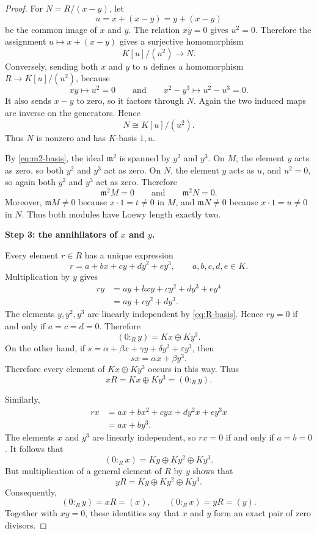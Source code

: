 \documentclass[a4paper]{amsart}
\theoremstyle{definition}
\theoremstyle{remark}
\numberwithin{equation}{section}
\begin{document}
\begin{proof}
For $N=R/(x-y)$, let
\[
 u=x+(x-y)=y+(x-y)
\]
be the common image of $x$ and $y$.  The relation $xy=0$ gives
$u^2=0$.  Therefore the assignment $u\mapsto x+(x-y)$ gives a
surjective homomorphism
\[
 K[u]/(u^2)\longrightarrow N.
\]
Conversely, sending both $x$ and $y$ to $u$ defines a homomorphism
$R\to K[u]/(u^2)$, because
\[
 xy\longmapsto u^2=0
 \qquad\text{and}\qquad
 x^2-y^3\longmapsto u^2-u^3=0.
\]
It also sends $x-y$ to zero, so it factors through $N$.  Again the two
induced maps are inverse on the generators.  Hence
\begin{equation}\label{eq:N-dual-numbers}
 N\cong K[u]/(u^2).
\end{equation}
Thus $N$ is nonzero and has $K$-basis $1,u$.

By \eqref{eq:m2-basis}, the ideal $\mathfrak m^2$ is spanned by $y^2$
and $y^3$.  On $M$, the element $y$ acts as zero, so both $y^2$ and
$y^3$ act as zero.  On $N$, the element $y$ acts as $u$, and
$u^2=0$, so again both $y^2$ and $y^3$ act as zero.  Therefore
\begin{equation}\label{eq:m2-kills-modules}
 \mathfrak m^2M=0
 \qquad\text{and}\qquad
 \mathfrak m^2N=0.
\end{equation}
Moreover, $\mathfrak mM\neq0$ because $x\cdot1=t\neq0$ in $M$, and
$\mathfrak mN\neq0$ because $x\cdot1=u\neq0$ in $N$.  Thus both
modules have Loewy length exactly two.

\medskip
\noindent
\textbf{Step 3: the annihilators of $x$ and $y$.}

Every element $r\in R$ has a unique expression
\[
 r=a+bx+cy+dy^2+ey^3,
 \qquad a,b,c,d,e\in K.
\]
Multiplication by $y$ gives
\begin{align*}
 ry
 &=ay+bxy+cy^2+dy^3+ey^4\\
 &=ay+cy^2+dy^3.
\end{align*}
The elements $y,y^2,y^3$ are linearly independent by
\eqref{eq:R-basis}.  Hence $ry=0$ if and only if
$a=c=d=0$.  Therefore
\[
 (0:_R y)=Kx\oplus Ky^3.
\]
On the other hand, if
$s=\alpha+\beta x+\gamma y+\delta y^2+\varepsilon y^3$, then
\[
 sx=\alpha x+\beta y^3.
\]
Therefore every element of $Kx\oplus Ky^3$ occurs in this way.  Thus
\[
 xR=Kx\oplus Ky^3=(0:_R y).
\]

Similarly,
\begin{align*}
 rx
 &=ax+bx^2+cyx+dy^2x+ey^3x\\
 &=ax+by^3.
\end{align*}
The elements $x$ and $y^3$ are linearly independent, so $rx=0$ if and
only if $a=b=0$.  It follows that
\[
 (0:_R x)=Ky\oplus Ky^2\oplus Ky^3.
\]
But multiplication of a general element of $R$ by $y$ shows that
\[
 yR=Ky\oplus Ky^2\oplus Ky^3.
\]
Consequently,
\begin{equation}\label{eq:annihilators}
 (0:_R y)=xR=(x),
 \qquad
 (0:_R x)=yR=(y).
\end{equation}
Together with $xy=0$, these identities say that $x$ and $y$ form an
exact pair of zero divisors.


\end{proof}
\end{document}
